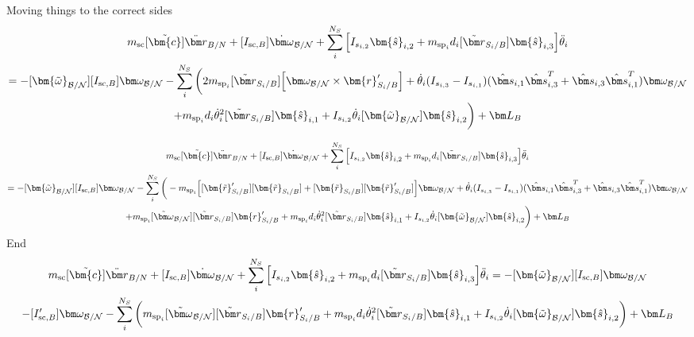 \documentclass[paper]{aiaaNew}
\begin{document}
Moving things to the correct sides
\begin{multline}
m_{\text{sc}}[\tilde{\bm{c}}]\ddot{\bm r}_{B/N} + [I_{\text{sc},B}] \dot{\bm\omega}_{\cal B/N} + \sum\limits_{i}^{N_S} \Big[I_{s_{i,2}} \bm{\hat{s}}_{i,2} + m_{\text{sp}_i} d_i [\tilde{{\bm r}}_{S_{i}/B}] \bm{\hat{s}}_{i,3}\Big] \ddot{\theta}_i \\
= -[\bm{\tilde{\omega}}_{\cal B/N}] [I_{\text{sc},B}] \bm\omega_{\cal B/N} - \sum\limits_{i}^{N_S}\bigg( 2 m_{\text{sp}_i} [\tilde{{\bm r}}_{S_{i}/B}] \Big[\bm\omega_{\cal B/N} \times \bm{r}'_{S_i/B}\Big] +\dot{\theta}_i(I_{s_{i,3}}-I_{s_{i,1}})(\hat{\bm s}_{i,1}\hat{\bm s}_{i,3}^{T}+\hat{\bm s}_{i,3}\hat{\bm s}_{i,1}^{T}) \bm\omega_{\cal B/N} \\
+ m_{\text{sp}_i} d_i \dot{\theta}_i^2 [\tilde{{\bm r}}_{S_{i}/B}]   \bm{\hat{s}}_{i,1}
+ I_{s_{i,2}} \dot{\theta}_i [\bm{\tilde{\omega}}_{\cal B/N}] \bm{\hat{s}}_{i,2} \bigg) + \bm L_B
\end{multline}

\begin{multline}
m_{\text{sc}}[\tilde{\bm{c}}]\ddot{\bm r}_{B/N} + [I_{\text{sc},B}] \dot{\bm\omega}_{\cal B/N} + \sum\limits_{i}^{N_S} \Big[I_{s_{i,2}} \bm{\hat{s}}_{i,2} + m_{\text{sp}_i} d_i [\tilde{{\bm r}}_{S_{i}/B}] \bm{\hat{s}}_{i,3}\Big] \ddot{\theta}_i \\
= -[\bm{\tilde{\omega}}_{\cal B/N}] [I_{\text{sc},B}] \bm\omega_{\cal B/N} - \sum\limits_{i}^{N_S}\bigg( - m_{\text{sp}_i}\Big[[\bm{\tilde{r}}'_{S_i/B}] [\bm{\tilde{r}}_{S_i/B}] + [\bm{\tilde{r}}_{S_i/B}] [\bm{\tilde{r}}'_{S_i/B}]\Big] \bm\omega_{\cal B/N} +\dot{\theta}_i(I_{s_{i,3}}-I_{s_{i,1}})(\hat{\bm s}_{i,1}\hat{\bm s}_{i,3}^{T}+\hat{\bm s}_{i,3}\hat{\bm s}_{i,1}^{T}) \bm\omega_{\cal B/N} \\
+ m_{\text{sp}_i} [\tilde{\bm\omega}_{\cal B/N}] [\tilde{{\bm r}}_{S_{i}/B}] \bm{r}'_{S_i/B} + m_{\text{sp}_i} d_i \dot{\theta}_i^2 [\tilde{{\bm r}}_{S_{i}/B}]   \bm{\hat{s}}_{i,1}
+ I_{s_{i,2}} \dot{\theta}_i [\bm{\tilde{\omega}}_{\cal B/N}] \bm{\hat{s}}_{i,2} \bigg) + \bm L_B
\end{multline}
End
\begin{multline}
m_{\text{sc}}[\tilde{\bm{c}}]\ddot{\bm r}_{B/N} + [I_{\text{sc},B}] \dot{\bm\omega}_{\cal B/N} + \sum\limits_{i}^{N_S} \Big[I_{s_{i,2}} \bm{\hat{s}}_{i,2} + m_{\text{sp}_i} d_i [\tilde{{\bm r}}_{S_{i}/B}] \bm{\hat{s}}_{i,3}\Big] \ddot{\theta}_i 
= -[\bm{\tilde{\omega}}_{\cal B/N}] [I_{\text{sc},B}] \bm\omega_{\cal B/N}\\ - [I'_{\text{sc},B}] \bm\omega_{\cal B/N} - \sum\limits_{i}^{N_S}\bigg( m_{\text{sp}_i} [\tilde{\bm\omega}_{\cal B/N}] [\tilde{{\bm r}}_{S_{i}/B}] \bm{r}'_{S_i/B} + m_{\text{sp}_i} d_i \dot{\theta}_i^2 [\tilde{{\bm r}}_{S_{i}/B}]   \bm{\hat{s}}_{i,1}
+ I_{s_{i,2}} \dot{\theta}_i [\bm{\tilde{\omega}}_{\cal B/N}] \bm{\hat{s}}_{i,2} \bigg) + \bm L_B
\end{multline}
\end{document}
